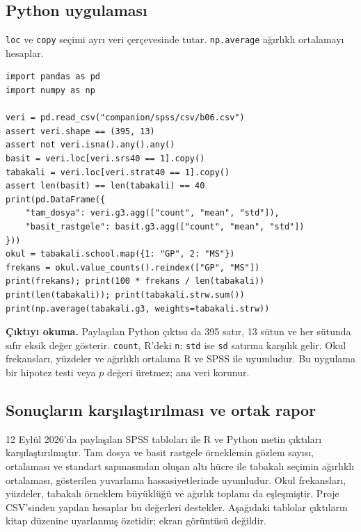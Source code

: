 \par\noindent\begin{minipage}{\linewidth}
\subsection{Python uygulaması}
\label{sec:python-b06}

\texttt{loc} ve \texttt{copy} seçimi ayrı veri çerçevesinde tutar. \texttt{np.average} ağırlıklı ortalamayı hesaplar.

\begin{lstlisting}[style=prismPythonApp]
import pandas as pd
import numpy as np

veri = pd.read_csv("companion/spss/csv/b06.csv")
assert veri.shape == (395, 13)
assert not veri.isna().any().any()
basit = veri.loc[veri.srs40 == 1].copy()
tabakali = veri.loc[veri.strat40 == 1].copy()
assert len(basit) == len(tabakali) == 40
print(pd.DataFrame({
    "tam_dosya": veri.g3.agg(["count", "mean", "std"]),
    "basit_rastgele": basit.g3.agg(["count", "mean", "std"])
}))
okul = tabakali.school.map({1: "GP", 2: "MS"})
frekans = okul.value_counts().reindex(["GP", "MS"])
print(frekans); print(100 * frekans / len(tabakali))
print(len(tabakali)); print(tabakali.strw.sum())
print(np.average(tabakali.g3, weights=tabakali.strw))
\end{lstlisting}

\textbf{Çıktıyı okuma.} Paylaşılan Python çıktısı da 395 satır,
13 sütun ve her sütunda sıfır eksik değer gösterir. \texttt{count}, R'deki
\texttt{n}; \texttt{std} ise \texttt{sd} satırına karşılık gelir.
Okul frekansları, yüzdeler ve ağırlıklı ortalama R ve SPSS ile uyumludur.
Bu uygulama bir hipotez testi veya $p$ değeri üretmez; ana veri korunur.
\end{minipage}\par

\subsection{Sonuçların karşılaştırılması ve ortak rapor}
12 Eylül 2026'da paylaşılan SPSS tabloları ile R ve Python metin
çıktıları karşılaştırılmıştır. Tam dosya ve basit rastgele örneklemin
gözlem sayısı, ortalaması ve standart sapmasından oluşan altı hücre ile
tabakalı seçimin ağırlıklı ortalaması, gösterilen yuvarlama
hassasiyetlerinde uyumludur. Okul frekansları, yüzdeler, tabakalı
örneklem büyüklüğü ve ağırlık toplamı da eşleşmiştir. Proje CSV'sinden
yapılan hesaplar bu değerleri destekler. Aşağıdaki tablolar çıktıların
kitap düzenine uyarlanmış özetidir; ekran görüntüsü değildir.

